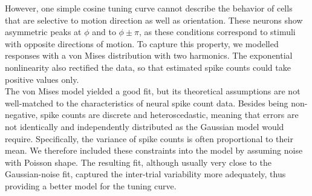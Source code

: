 \documentclass[10pt]{article}
\begin{document}
However, one simple cosine tuning curve cannot describe the behavior of cells that are selective to motion direction as well as orientation. These neurons show asymmetric peaks at $\phi$ and to $\phi \pm \pi$, as these conditions correspond to stimuli with opposite directions of motion. To capture this property, we modelled responses with a von Mises distribution with two harmonics. The exponential nonlinearity also rectified the data, so that estimated spike counts could take positive values only. \\

The von Mises model yielded a good fit, but its theoretical assumptions are not well-matched to the characteristics of neural spike count data. Besides being non-negative, spike counts are discrete and heteroscedastic, meaning that errors are not identically and independently distributed as the Gaussian model would require. Specifically, the variance of spike counts is often proportional to their mean. We therefore included these constraints into the model by assuming noise with Poisson shape. The resulting fit, although usually very close to the Gaussian-noise fit, captured the inter-trial variability more adequately, thus providing a better model for the tuning curve.

\newpage


\end{document}
